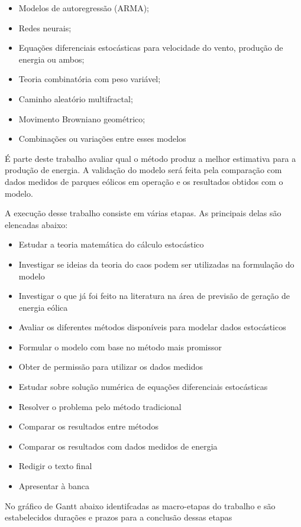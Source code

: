 \documentclass[
	12pt,				%
	openright,			%
	oneside,			%
	a4paper,			%
	english,			%
	french,				%
	spanish,			%
	brazil				%
	]{abntex2}
\begin{document}
\begin{itemize}
	\item Modelos de autoregressão (ARMA);
	\item Redes neurais;
	\item Equações diferenciais estocásticas para velocidade do vento, produção de energia ou ambos;
	\item Teoria combinatória com peso variável;
	\item Caminho aleatório multifractal;
	\item Movimento Browniano geométrico;
	\item Combinações ou variações entre esses modelos
 \end{itemize}
 
É parte deste trabalho avaliar qual o método produz a melhor estimativa para a produção de energia. A validação do modelo será feita pela comparação com dados medidos de parques eólicos em operação e os resultados obtidos com o modelo.

A execução desse trabalho consiste em várias etapas. As principais delas são elencadas abaixo:

\begin{itemize}
	\item Estudar a teoria matemática do cálculo estocástico
	\item Investigar se ideias da teoria do caos podem ser utilizadas na formulação do modelo
	\item Investigar o que já foi feito na literatura na área de previsão de geração de energia eólica
	\item Avaliar os diferentes métodos disponíveis para modelar dados estocásticos
	\item Formular o modelo com base no método mais promissor
	\item Obter de permissão para utilizar os dados medidos
	\item Estudar sobre solução numérica de equações diferenciais estocásticas
	\item Resolver o problema pelo método tradicional
	\item Comparar os resultados entre métodos
	\item Comparar os resultados com dados medidos de energia
	\item Redigir o texto final
	\item Apresentar à banca
 \end{itemize}
 
 No gráfico de Gantt abaixo identifcadas as macro-etapas do trabalho e são estabelecidos durações e prazos para a conclusão dessas etapas
 
\end{document}
